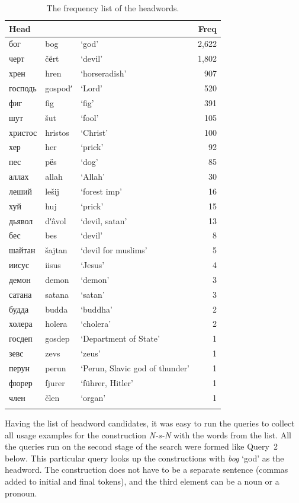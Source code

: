 \documentclass[output=paper]{langscibook}
\begin{document}
\begin{table}
\begin{tabular}{lllr}
\lsptoprule
{Head} &  &  & {Freq}\\
\midrule
{{бог}} & {bog} & {‘god’} & {2,622}\\
{{черт}} & {č{ёrt}} & {‘devil’} & {1,802}\\
{{хрен}} & {hren} & {‘horseradish’} & {907}\\
{{господь}} & {gospodʹ} & {‘Lord’} & {520}\\
{{фиг}} & {fig} & {‘fig’} & {391}\\
{{шут}} & {šut} & {‘fool’} & {105}\\
{{христос}} & {hristos} & {‘Christ’} & {100}\\
{{хер}} & {her} & {‘prick’} & {92}\\
{{пес}} & {p{ёs}} & {‘dog’} & {85}\\
{{аллах}} & {allah} & {‘Allah’} & {30}\\
{{леший}} & {lešij} & {‘forest imp’} & {16}\\
{{хуй}} & {huj} & {‘prick’} & {15}\\
{{дьявол}} & {dʹâvol} & {‘devil, satan’} & {13}\\
{{бес}} & {bes} & {‘devil’} & {8}\\
{{шайтан}} & {šajtan} & {‘devil for muslims’} & {5}\\
{{иисус}} & {iisus} & {‘Jesus’} & {4}\\
{{демон}} & {demon} & {‘demon’} & {3}\\
{{сатана}} & {satana} & {‘satan’} & {3}\\
{{будда}} & {budda} & {‘buddha’} & {2}\\
{{холера}} & {holera} & {‘cholera’} & {2}\\
{{госдеп}} & {gosdep} & {‘Department of State’} & {1}\\
{{зевс}} & {zevs} & {‘zeus’} & {1}\\
{{перун}} & {perun} & {‘Perun, Slavic god of thunder’} & {1}\\
{{фюрер}} & {fjurer} & {‘führer, Hitler’} & {1}\\
{{член}} & {člen} & {‘organ’} & {1}\\
\lspbottomrule
\end{tabular}
\caption{The frequency list of the headwords.\label{tab:mikhailov:1}}
\end{table}

Having the list of headword candidates, it was easy to run the queries to collect all usage examples for the construction \textit{N-s-N} with the words from the list. All the queries run on the second stage of the search were formed like Query~2 below. This particular query looks up the constructions with \textit{bog} ‘god’ as the headword. The construction does not have to be a separate sentence (commas added to initial and final tokens), and the third element can be a noun or a pronoun.
\end{document}
